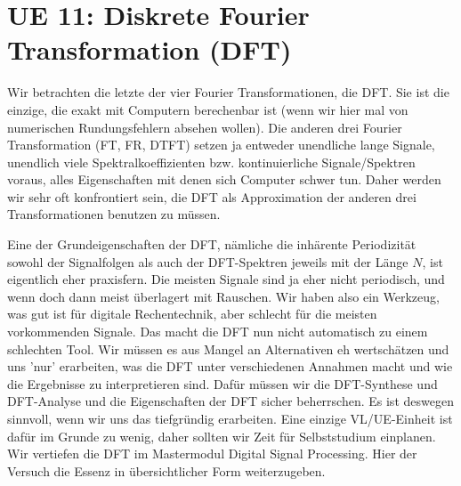 \newpage
\section{UE 11: Diskrete Fourier Transformation (DFT)}
%
Wir betrachten die letzte der vier Fourier Transformationen, die DFT.
Sie ist die einzige, die exakt mit Computern berechenbar ist (wenn wir hier
mal von numerischen Rundungsfehlern absehen wollen).
%
Die anderen drei Fourier Transformation (FT, FR, DTFT) setzen ja entweder
unendliche lange Signale, unendlich viele Spektralkoeffizienten bzw.
kontinuierliche Signale/Spektren
voraus, alles Eigenschaften mit denen sich Computer schwer tun.
%
Daher werden wir sehr oft konfrontiert sein, die DFT als Approximation
der anderen drei Transformationen benutzen zu müssen.
%

Eine der Grundeigenschaften der DFT, nämliche die inhärente
Periodizität sowohl der Signalfolgen als auch der DFT-Spektren jeweils mit
der Länge $N$, ist eigentlich
eher praxisfern. Die meisten Signale sind ja eher nicht periodisch, und wenn
doch dann meist überlagert mit Rauschen.
%
Wir haben also ein Werkzeug, was gut ist für digitale Rechentechnik, aber
schlecht für die meisten vorkommenden Signale.
%
Das macht die DFT nun nicht automatisch zu einem schlechten Tool. Wir müssen
es aus Mangel an Alternativen eh wertschätzen und uns 'nur' erarbeiten, was die
DFT unter verschiedenen Annahmen macht und wie die Ergebnisse zu interpretieren
sind.
%
Dafür müssen wir die DFT-Synthese und DFT-Analyse
und die Eigenschaften der DFT sicher beherrschen.
%
%
Es ist deswegen sinnvoll, wenn wir uns das tiefgründig erarbeiten. Eine einzige
VL/UE-Einheit ist dafür im Grunde zu wenig, daher sollten wir Zeit für
Selbststudium einplanen. Wir vertiefen die DFT im Mastermodul Digital Signal
Processing.
Hier der Versuch die Essenz in übersichtlicher Form weiterzugeben.

